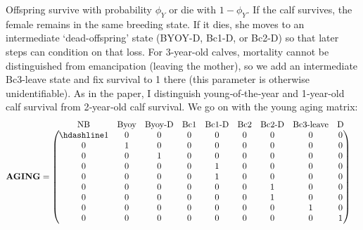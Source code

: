 \documentclass[
  12pt,
]{krantz}
\begin{document}
Offspring survive with probability \(\phi_Y\) or die with \(1-\phi_Y\). If the calf survives, the female remains in the same breeding state. If it dies, she moves to an intermediate `dead-offspring' state (BYOY-D, Bc1-D, or Bc2-D) so that later steps can condition on that loss. For 3-year-old calves, mortality cannot be distinguished from emancipation (leaving the mother), so we add an intermediate Bc3-leave state and fix survival to 1 there (this parameter is otherwise unidentifiable). As in the paper, I distinguish young‐of‐the‐year and 1‐year‐old calf survival from 2‐year‐old calf survival. We go on with the young aging matrix:
\[
\begin{matrix}
& \\
\mathbf{AGING} =
\left ( \vphantom{ \begin{matrix} 12 \\ 12 \\ 12 \\ 12 \\ 12 \\ 12 \\ 12 \\ 12 \\ 12 \end{matrix} } \right .
\end{matrix}
\hspace{-1.2em}
\begin{matrix}
\text{NB} & \text{Byoy} & \text{Byoy-D} & \text{Bc1} & \text{Bc1-D} & \text{Bc2} & \text{Bc2-D} & \text{Bc3-leave} & \text{D} \\ \hdashline
1 & 0 & 0 & 0 & 0 & 0 & 0 & 0 & 0 \\
0 & 1 & 0 & 0 & 0 & 0 & 0 & 0 & 0 \\
0 & 0 & 1 & 0 & 0 & 0 & 0 & 0 & 0 \\
0 & 0 & 0 & 0 & 1 & 0 & 0 & 0 & 0 \\
0 & 0 & 0 & 0 & 1 & 0 & 0 & 0 & 0 \\
0 & 0 & 0 & 0 & 0 & 0 & 1 & 0 & 0 \\
0 & 0 & 0 & 0 & 0 & 0 & 1 & 0 & 0 \\
0 & 0 & 0 & 0 & 0 & 0 & 0 & 1 & 0 \\
0 & 0 & 0 & 0 & 0 & 0 & 0 & 0 & 1
\end{matrix}
\hspace{-0.2em}
\begin{matrix}
& \\
\left . \vphantom{ \begin{matrix} 12 \\ 12 \\ 12 \\ 12 \\ 12 \\ 12 \\ 12 \\ 12 \\ 12 \end{matrix} } \right )

\end{matrix}\]
\end{document}

